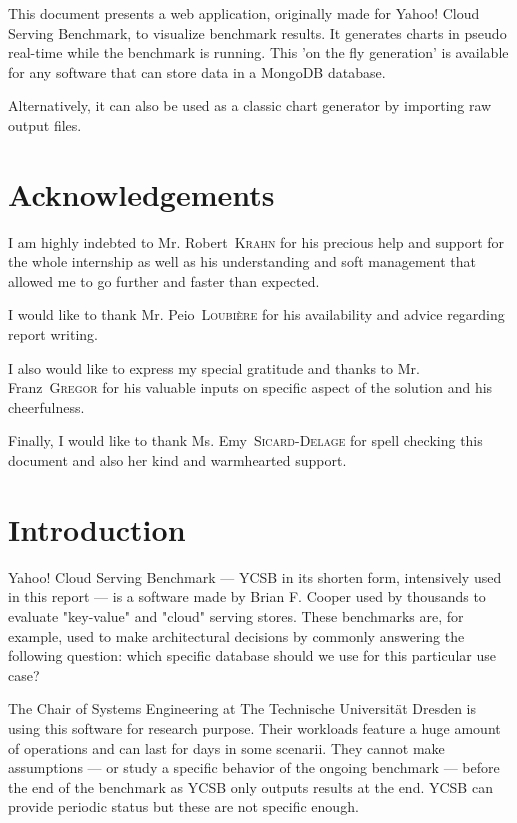 \documentclass[a4paper,11pt]{report}
\newcommand*{\auteur}[2]{\large #1~\textsc{#2}} %
\begin{document}
This document presents a web application, originally made for Yahoo! Cloud Serving Benchmark, to visualize benchmark results. It generates charts in pseudo real-time while the benchmark is running. This 'on the fly generation' is available for any software that can store data in a MongoDB database. 

Alternatively, it can also be used as a classic chart generator by importing raw output files.

\tableofcontents

\newpage

\listoffigures  %

\newpage
\chapter*{Acknowledgements}

I am highly indebted to Mr. \auteur{Robert}{Krahn} for his precious help and support for the whole internship as well as his understanding and soft management that allowed me to go further and faster than expected.

I would like to thank Mr. \auteur{Peio}{Loubière} for his availability and advice regarding report writing.

I also would like to express my special gratitude and thanks to Mr. \auteur{Franz}{Gregor} for his valuable inputs on specific aspect of the solution and his cheerfulness.

Finally, I would like to thank Ms. \auteur{Emy}{Sicard-Delage} for spell checking this document and also her kind and warmhearted support.

\chapter*{Introduction}

Yahoo! Cloud Serving Benchmark --- YCSB in its shorten form, intensively used in this report --- is a software made by Brian F. Cooper \cite{ycsb:repo} used by thousands to evaluate "key-value" and "cloud" serving stores. These benchmarks are, for example, used to make architectural decisions by commonly answering the following question: which specific database should we use for this particular use case?

The Chair of Systems Engineering at The Technische Universität Dresden is using this software for research purpose. Their workloads feature a huge amount of operations and can last for days in some scenarii. They cannot make assumptions --- or study a specific behavior of the ongoing benchmark --- before the end of the benchmark as YCSB only outputs results at the end.
YCSB can provide periodic status but these are not specific enough.
\end{document}
